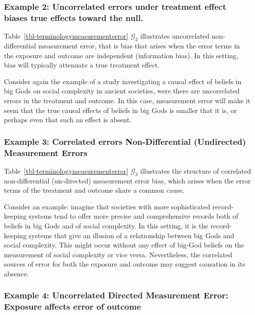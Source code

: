 \documentclass[
  single column]{article}
\begin{document}
\subsubsection{Example 2: Uncorrelated errors under treatment effect
biases true effects toward the
null.}\label{example-2-uncorrelated-errors-under-treatment-effect-biases-true-effects-toward-the-null.}

Table~\ref{tbl-terminologymeasurementerror} \(\mathcal{G}_2\)
illustrates uncorrelated non-differential measurement error, that is
bias that arises when the error terms in the exposure and outcome are
independent (information bias). In this setting, bias will typically
attenuate a true treatment effect.

Consider again the example of a study investigating a causal effect of
beliefs in big Gods on social complexity in ancient societies, were
there are uncorrelated errors in the treatment and outcome. In this
case, measurement error will make it seem that the true causal effects
of beliefs in big Gods is smaller that it is, or perhaps even that such
an effect is absent.

\subsubsection{Example 3: Correlated errors Non-Differential
(Undirected) Measurement
Errors}\label{example-3-correlated-errors-non-differential-undirected-measurement-errors}

Table~\ref{tbl-terminologymeasurementerror} \(\mathcal{G}_3\)
illustrates the structure of correlated non-differential (un-directed)
measurement error bias, which arises when the error terms of the
treatment and outcome share a common cause.

Consider an example: imagine that societies with more sophisticated
record-keeping systems tend to offer more precise and comprehensive
records both of beliefs in big Gods and of social complexity. In this
setting, it is the record-keeping systems that give an illusion of a
relationship between big Gods and social complexity. This might occur
without any effect of big-God beliefs on the measurement of social
complexity or vice versa. Nevertheless, the correlated sources of error
for both the exposure and outcome may suggest causation in its absence.

\subsubsection{Example 4: Uncorrelated Directed Measurement Error:
Exposure affects error of
outcome}\label{example-4-uncorrelated-directed-measurement-error-exposure-affects-error-of-outcome}
\end{document}
